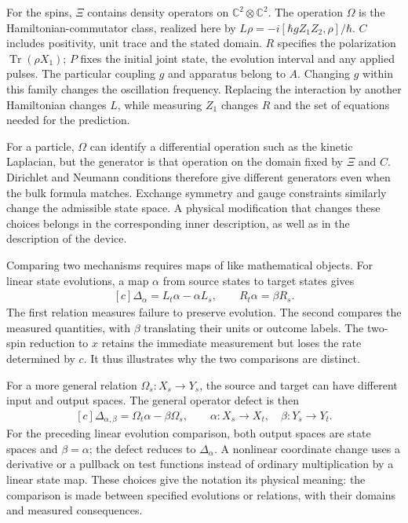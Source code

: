 \documentclass[11pt,oneside]{book}
\newenvironment{centeredalign}{\[\begin{gathered}[c]}{\end{gathered}\]}
\begin{document}
For the spins, \(\Xi\) contains density operators on
\(\mathbb C^2\otimes\mathbb C^2\). The operation \(\Omega\)
is the Hamiltonian-commutator class, realized here by
\(L\rho=-i[\hbar gZ_1Z_2,\rho]/\hbar\).
\(C\) includes positivity, unit trace and the stated domain.
\(R\) specifies the polarization
\(\operatorname{Tr}(\rho X_1)\); \(P\) fixes the initial
joint state, the evolution interval and any applied pulses.
The particular coupling \(g\) and apparatus belong to
\(A\). Changing \(g\) within this family changes the
oscillation frequency. Replacing the interaction by another
Hamiltonian changes \(L\), while measuring \(Z_1\) changes
\(R\) and the set of equations needed for the prediction.

For a particle, \(\Omega\) can identify a differential
operation such as the kinetic Laplacian, but the generator
is that operation on the domain fixed by \(\Xi\) and
\(C\). Dirichlet and Neumann conditions therefore give
different generators even when the bulk formula matches.
Exchange symmetry and gauge constraints similarly change
the admissible state space. A physical modification that
changes these choices belongs in the corresponding inner
description, as well as in the description of the device.

Comparing two mechanisms requires maps of like mathematical
objects. For linear state evolutions, a map \(\alpha\)
from source states to target states gives
\begin{centeredalign}
\Delta_\alpha=L_t\alpha-\alpha L_s,\qquad
R_t\alpha=\beta R_s.
\end{centeredalign}
The first relation measures failure to preserve evolution.
The second compares the measured quantities, with
\(\beta\) translating their units or outcome labels.
The two-spin reduction to \(x\) retains the immediate
measurement but loses the rate determined by \(c\).
It thus illustrates why the two comparisons are distinct.

For a more general relation \(\Omega_s:X_s\to Y_s\),
the source and target can have different input and output
spaces. The general operator defect is then
\begin{centeredalign}
\Delta_{\alpha,\beta}=\Omega_t\alpha-\beta\Omega_s,
\qquad \alpha:X_s\to X_t,\quad \beta:Y_s\to Y_t.
\end{centeredalign}
For the preceding linear evolution comparison, both output
spaces are state spaces and \(\beta=\alpha\); the defect
reduces to \(\Delta_\alpha\). A nonlinear coordinate change
uses a derivative or a pullback on test functions instead
of ordinary multiplication by a linear state map. These
choices give the notation its physical meaning: the
comparison is made between specified evolutions or
relations, with their domains and measured consequences.
\end{document}
